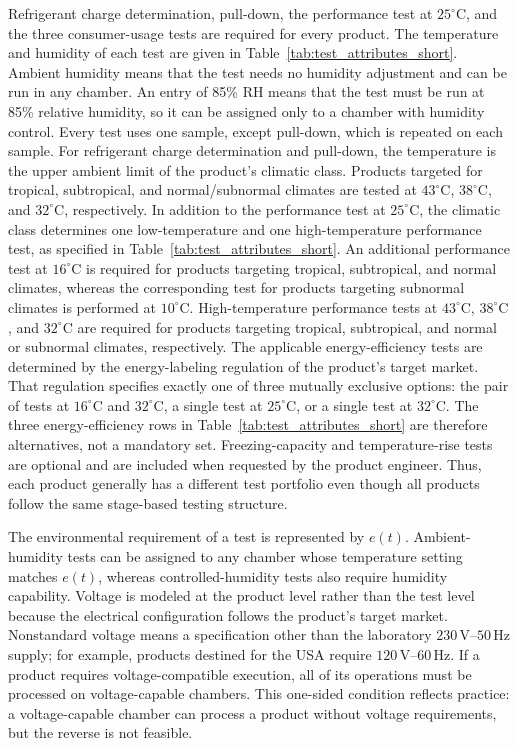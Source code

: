 \documentclass[11pt]{article}
\begin{document}
Refrigerant charge determination, pull-down, the performance test at
\(25^\circ\mathrm{C}\), and the three consumer-usage tests are required
for every product.
The temperature and humidity of each test are given in
Table~\ref{tab:test_attributes_short}.
Ambient humidity means that the test needs no humidity adjustment and
can be run in any chamber.
An entry of 85\% RH means that the test must be run at 85\% relative
humidity, so it can be assigned only to a chamber with humidity control.
Every test uses one sample, except pull-down, which is repeated on each
sample.
For refrigerant charge determination and pull-down, the temperature is
the upper ambient limit of the product's climatic class.
Products targeted for tropical, subtropical, and normal/subnormal
climates are tested at \(43^\circ\mathrm{C}\), \(38^\circ\mathrm{C}\),
and \(32^\circ\mathrm{C}\), respectively.
In addition to the performance test at \(25^\circ\mathrm{C}\), the
climatic class determines one low-temperature and one high-temperature
performance test, as specified in Table~\ref{tab:test_attributes_short}.
An additional performance test at \(16^\circ\mathrm{C}\) is required for
products targeting tropical, subtropical, and normal climates, whereas
the corresponding test for products targeting subnormal climates is
performed at \(10^\circ\mathrm{C}\).
High-temperature performance tests at \(43^\circ\mathrm{C}\),
\(38^\circ\mathrm{C}\), and \(32^\circ\mathrm{C}\) are required for
products targeting tropical, subtropical, and normal or subnormal
climates, respectively.
The applicable energy-efficiency tests are determined by the
energy-labeling regulation of the product's target market.
That regulation specifies exactly one of three mutually exclusive
options: the pair of tests at \(16^\circ\mathrm{C}\) and
\(32^\circ\mathrm{C}\), a single test at \(25^\circ\mathrm{C}\), or a
single test at \(32^\circ\mathrm{C}\).
The three energy-efficiency rows in Table~\ref{tab:test_attributes_short} are
therefore alternatives, not a mandatory set.
Freezing-capacity and temperature-rise tests are optional and are
included when requested by the product engineer.
Thus, each product generally has a different test portfolio even though
all products follow the same stage-based testing structure.

The environmental requirement of a test is represented by \(e(t)\). Ambient-humidity tests can be assigned to any chamber whose temperature setting matches \(e(t)\), whereas controlled-humidity tests also require humidity capability. Voltage is modeled at the product level rather than the test level because the electrical configuration follows the product's target market. Nonstandard voltage means a specification other than the laboratory \(230\,\mathrm{V}\)--\(50\,\mathrm{Hz}\) supply; for example, products destined for the USA require \(120\,\mathrm{V}\)--\(60\,\mathrm{Hz}\). If a product requires voltage-compatible execution, all of its operations must be processed on voltage-capable chambers. This one-sided condition reflects practice: a voltage-capable chamber can process a product without voltage requirements, but the reverse is not feasible.
\end{document}
